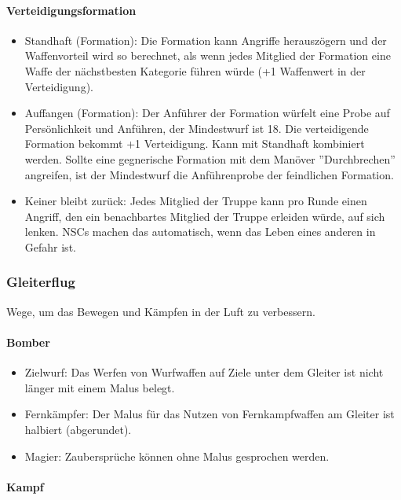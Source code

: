 \documentclass{article}
\begin{document}
\paragraph{Verteidigungsformation}

\begin{itemize}
\item Standhaft (Formation): Die Formation kann Angriffe herauszögern und der Waffenvorteil wird so berechnet, als wenn jedes Mitglied der Formation eine Waffe der nächstbesten Kategorie führen würde (+1 Waffenwert in der Verteidigung).
\item Auffangen (Formation): Der Anführer der Formation würfelt eine Probe auf Persönlichkeit und Anführen, der Mindestwurf ist 18. Die verteidigende Formation bekommt +1 Verteidigung. Kann mit Standhaft kombiniert werden. Sollte eine gegnerische Formation mit dem Manöver ''Durchbrechen'' angreifen, ist der Mindestwurf die Anführenprobe der feindlichen Formation.
\item Keiner bleibt zurück: Jedes Mitglied der Truppe kann pro Runde einen Angriff, den ein benachbartes Mitglied der Truppe erleiden würde, auf sich lenken. NSCs machen das automatisch, wenn das Leben eines anderen in Gefahr ist.
\end{itemize}

\subsubsection{Gleiterflug}

Wege, um das Bewegen und Kämpfen in der Luft zu verbessern.

\paragraph{Bomber}

\begin{itemize}
\item Zielwurf: Das Werfen von Wurfwaffen auf Ziele unter dem Gleiter ist nicht länger mit einem Malus belegt.
\item Fernkämpfer: Der Malus für das Nutzen von Fernkampfwaffen am Gleiter ist halbiert (abgerundet).
\item Magier: Zaubersprüche können ohne Malus gesprochen werden.
\end{itemize}

\paragraph{Kampf}
\end{document}
